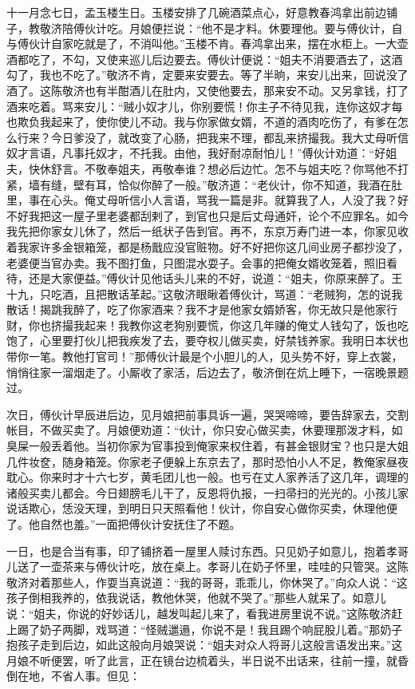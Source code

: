 十一月念七日，孟玉楼生日。玉楼安排了几碗酒菜点心，好意教春鸿拿出前边铺子，教敬济陪傅伙计吃。月娘便拦说：“他不是才料。休要理他。要与傅伙计，自与傅伙计自家吃就是了，不消叫他。”玉楼不肯。春鸿拿出来，摆在水柜上。一大壶酒都吃了，不勾，又使来巡儿后边要去。傅伙计便说：“姐夫不消要酒去了，这酒勾了，我也不吃了。”敬济不肯，定要来安要去。等了半晌，来安儿出来，回说没了酒了。这陈敬济也有半酣酒儿在肚内，又使他要去，那来安不动。又另拿钱，打了酒来吃着。骂来安儿：“贼小奴才儿，你别要慌！你主子不待见我，连你这奴才每也欺负我起来了，使你使儿不动。我与你家做女婿，不道的酒肉吃伤了，有爹在怎么行来？今日爹没了，就改变了心肠，把我来不理，都乱来挤撮我。我大丈母听信奴才言语，凡事托奴才，不托我。由他，我好耐凉耐怕儿！”傅伙计劝道：“好姐夫，快休舒言。不敬奉姐夫，再敬奉谁？想必后边忙。怎不与姐夫吃？你骂他不打紧，墙有缝，壁有耳，恰似你醉了一般。”敬济道：“老伙计，你不知道，我酒在肚里，事在心头。俺丈母听信小人言语，骂我一篇是非。就算我了人，人没了我？好不好我把这一屋子里老婆都刮剌了，到官也只是后丈母通奸，论个不应罪名。如今我先把你家女儿休了，然后一纸状子告到官。再不，东京万寿门进一本，你家见收着我家许多金银箱笼，都是杨戬应没官赃物。好不好把你这几间业房子都抄没了，老婆便当官办卖。我不图打鱼，只图混水耍子。会事的把俺女婿收笼着，照旧看待，还是大家便益。”傅伙计见他话头儿来的不好，说道：“姐夫，你原来醉了。王十九，只吃酒，且把散话革起。”这敬济眼瞅着傅伙计，骂道：“老贼狗，怎的说我散话！揭跳我醉了，吃了你家酒来？我不才是他家女婿娇客，你无故只是他家行财，你也挤撮我起来！我教你这老狗别要慌，你这几年赚的俺丈人钱勾了，饭也吃饱了，心里要打伙儿把我疾发了去，要夺权儿做买卖，好禁钱养家。我明日本状也带你一笔。教他打官司！”那傅伙计最是个小胆儿的人，见头势不好，穿上衣裳，悄悄往家一溜烟走了。小厮收了家活，后边去了，敬济倒在炕上睡下，一宿晚景题过。

次日，傅伙计早辰进后边，见月娘把前事具诉一遍，哭哭啼啼，要告辞家去，交割帐目，不做买卖了。月娘便劝道：“伙计，你只安心做买卖，休要理那泼才料，如臭屎一般丢着他。当初你家为官事投到俺家来权住着，有甚金银财宝？也只是大姐几件妆奁，随身箱笼。你家老子便躲上东京去了，那时恐怕小人不足，教俺家昼夜耽心。你来时才十六七岁，黄毛团儿也一般。也亏在丈人家养活了这几年，调理的诸般买卖儿都会。今日翅膀毛儿干了，反恩将仇报，一扫帚扫的光光的。小孩儿家说话欺心，恁没天理，到明日只天照看他！伙计，你自安心做你买卖，休理他便了。他自然也羞。”一面把傅伙计安抚住了不题。

一日，也是合当有事，印了铺挤着一屋里人赎讨东西。只见奶子如意儿，抱着孝哥儿送了一壶茶来与傅伙计吃，放在桌上。孝哥儿在奶子怀里，哇哇的只管哭。这陈敬济对着那些人，作耍当真说道：“我的哥哥，乖乖儿，你休哭了。”向众人说：“这孩子倒相我养的，依我说话，教他休哭，他就不哭了。”那些人就呆了。如意儿说：“姐夫，你说的好妙话儿，越发叫起儿来了，看我进房里说不说。”这陈敬济赶上踢了奶子两脚，戏骂道：“怪贼邋遢，你说不是！我且踢个响屁股儿着。”那奶子抱孩子走到后边，如此这般向月娘哭说：“姐夫对众人将哥儿这般言语发出来。”这月娘不听便罢，听了此言，正在镜台边梳着头，半日说不出话来，往前一撞，就昏倒在地，不省人事。但见：

